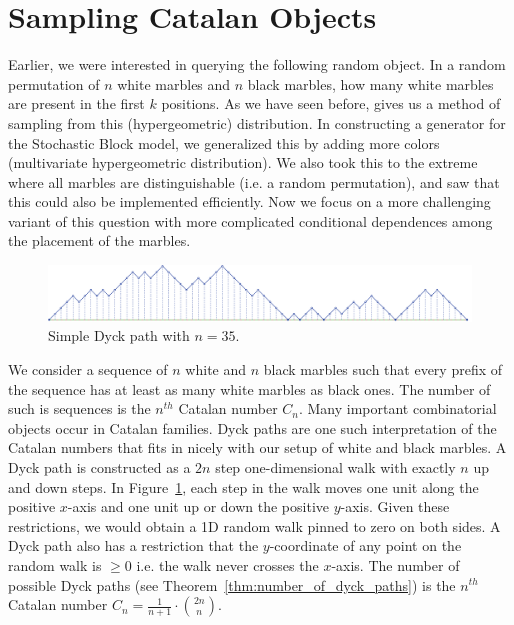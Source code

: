 \section{Sampling Catalan Objects}%
\label{sec:catalan_objects}

Earlier, we were interested in querying the following random object.
In a random permutation of $n$ white marbles and $n$ black marbles, how many white marbles are present in the first $k$ positions.
As we have seen before,  \cite{huge} gives us a method of sampling from this (hypergeometric) distribution.
In constructing a generator for the Stochastic Block model, we generalized this by adding more colors (multivariate hypergeometric distribution).
We also took this to the extreme where all marbles are distinguishable (i.e. a random permutation),
and saw that this could also be implemented efficiently.
Now we focus on a more challenging variant of this question with more complicated conditional dependences among the placement of the marbles.

\begin{figure}[htbp]
    \centering
    \includegraphics[width=\textwidth]{images/basic_dyck_path.pdf}
    \caption{Simple Dyck path with $n = 35$.}
    \label{fig:basic_dyck}
\end{figure}
We consider a sequence of $n$ white and $n$ black marbles such that every prefix of the sequence has at least as many white marbles as black ones.
The number of such is sequences is the $n^{th}$ Catalan number $C_n$.
Many important combinatorial objects occur in Catalan families.
Dyck paths are one such interpretation of the Catalan numbers that fits in nicely with our setup of white and black marbles.
A Dyck path is constructed as a $2n$ step one-dimensional walk with exactly $n$ up and down steps.
In Figure~\ref{fig:basic_dyck}, each step in the walk moves one unit along the positive $x$-axis and one unit up or down the positive $y$-axis.
Given these restrictions, we would obtain a 1D random walk pinned to zero  on both sides.
A Dyck path also has a restriction that the $y$-coordinate of any point on the random walk is $\ge 0$ i.e. the walk never crosses the $x$-axis.
The number of possible Dyck paths (see Theorem~\ref{thm:number_of_dyck_paths}) is the $n^{th}$ Catalan number $C_n=\frac{1}{n+1}\cdot{2n\choose n}$.


